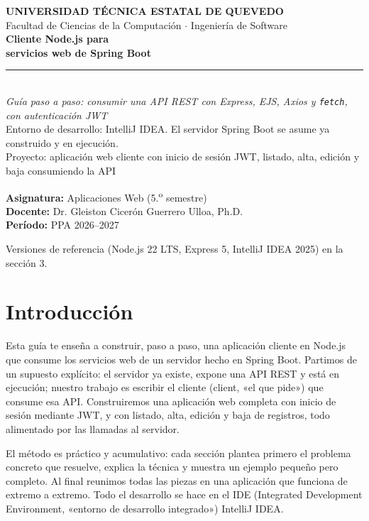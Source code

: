 \documentclass[11pt]{article}
\begin{document}
\begin{titlepage}
\vspace*{1.1cm}
{\color{ndverde}\bfseries\large UNIVERSIDAD T\'ECNICA ESTATAL DE QUEVEDO}\\[2pt]
{\color{gray} Facultad de Ciencias de la Computaci\'on $\cdot$ Ingenier\'ia de Software}\\[2cm]
{\color{tinta}\bfseries\fontsize{29}{33}\selectfont Cliente Node.js para}\\[6pt]
{\color{ndverde}\bfseries\fontsize{29}{33}\selectfont servicios web de Spring Boot}\\[10pt]
{\color{ndnaranja}\rule{\linewidth}{2.2pt}}\\[10pt]
{\itshape\large Gu\'ia paso a paso: consumir una {API} {REST} con Express, {EJS}, Axios y \texttt{fetch}, con autenticaci\'on {JWT}}\\[4pt]
{\color{gray} Entorno de desarrollo: IntelliJ IDEA. El servidor Spring Boot se asume ya construido y en ejecuci\'on.}\\[2.4cm]
{\color{ndverdeo} Proyecto: aplicaci\'on web cliente con inicio de sesi\'on {JWT}, listado, alta, edici\'on y baja consumiendo la {API}}\\[2cm]
\begin{flushleft}
\textbf{Asignatura:} Aplicaciones Web (5.\textsuperscript{o} semestre)\\[3pt]
\textbf{Docente:} Dr. Gleiston Cicer\'on Guerrero Ulloa, Ph.D.\\[3pt]
\textbf{Per\'iodo:} PPA 2026--2027
\end{flushleft}
\vfill
{\color{gray}\small Versiones de referencia (Node.js 22 LTS, Express 5, IntelliJ IDEA 2025) en la secci\'on 3.}
\end{titlepage}
\tableofcontents
\clearpage

\section{Introducción}
Esta guía te enseña a construir, paso a paso, una aplicación cliente en Node.js que consume los servicios web de un servidor hecho en Spring Boot. Partimos de un supuesto explícito: el servidor ya existe, expone una API REST y está en ejecución; nuestro trabajo es escribir el cliente (client, «el que pide») que consume esa API. Construiremos una aplicación web completa con inicio de sesión mediante JWT, y con listado, alta, edición y baja de registros, todo alimentado por las llamadas al servidor.

El método es práctico y acumulativo: cada sección plantea primero el problema concreto que resuelve, explica la técnica y muestra un ejemplo pequeño pero completo. Al final reunimos todas las piezas en una aplicación que funciona de extremo a extremo. Todo el desarrollo se hace en el IDE (Integrated Development Environment, «entorno de desarrollo integrado») IntelliJ IDEA.
\end{document}
